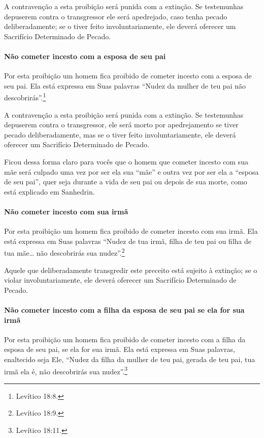 A contravenção a esta proibição será punida com a extinção. Se
testemunhas depuserem contra o transgressor ele será apedrejado, caso
tenha pecado deliberadamente; se o tiver feito involuntariamente, ele
deverá oferecer um Sacrifício Determinado de Pecado.

\paragraph{Não cometer incesto com a esposa de seu pai}

Por esta proibição um homem fica proibido de cometer incesto com a
esposa de seu pai. Ela está expressa em Suas palavras ``Nudez da mulher
de teu pai não descobrirás''.\footnote{Levítico 18:8.}

A contravenção a esta proibição será punida com a extinção. Se
testemunhas depuserem contra o transgressor, ele será morto por
apedrejamento se tiver pecado deliberadamente, mas se o tiver feito
involuntariamente, ele deverá oferecer um Sacrifício Determinado de
Pecado.

Ficou dessa forma claro para vocês que o homem que cometer incesto com
sua mãe será culpado uma vez por ser ela sua ``mãe'' e outra vez por ser
ela a ``esposa de seu pai'', quer seja durante a vida de seu pai ou
depois de sua morte, como está explicado em Sanhedrin.

\paragraph{Não cometer incesto com sua irmã}

Por esta proibição um homem fica proibido de cometer incesto com sua
irmã. Ela está expressa em Suas palavras ``Nudez de tua irmã, filha de
teu pai ou filha de tua mãe\ldots{} não descobrirás sua nudez''.\footnote{Levítico
18:9.}

Aquele que deliberadamente transgredir este preceito está sujeito à
extinção; se o violar involuntariamente, ele deverá oferecer um
Sacrifício Determinado de Pecado.

\paragraph{Não cometer incesto com a filha da esposa de seu pai se ela for sua irmã}

Por esta proibição um homem fica proibido de cometer incesto com a filha
da esposa de seu pai, se ela for sua irmã. Ela está expressa em Suas
palavras, enaltecido seja Ele, ``Nudez da filha da mulher de teu pai,
gerada de teu pai, tua irmã ela é, não descobrirás sua nudez''.\footnote{Levítico
18:11.}

